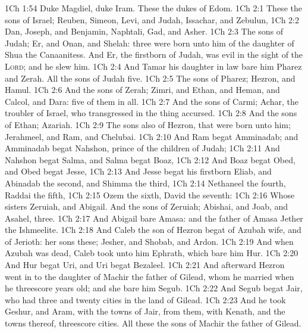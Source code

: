 \vs 1Ch 1:54 Duke Magdiel, duke Iram. These  the dukes of Edom.
\vs 1Ch 2:1 These  the sons of Israel; Reuben, Simeon, Levi, and Judah, Issachar, and Zebulun,
\vs 1Ch 2:2 Dan, Joseph, and Benjamin, Naphtali, Gad, and Asher.
\vs 1Ch 2:3 The sons of Judah; Er, and Onan, and Shelah:  three were born unto him of the daughter of Shua the Canaanitess. And Er, the firstborn of Judah, was evil in the sight of the \textsc{Lord}; and he slew him.
\vs 1Ch 2:4 And Tamar his daughter in law bare him Pharez and Zerah. All the sons of Judah  five.
\vs 1Ch 2:5 The sons of Pharez; Hezron, and Hamul.
\vs 1Ch 2:6 And the sons of Zerah; Zimri, and Ethan, and Heman, and Calcol, and Dara: five of them in all.
\vs 1Ch 2:7 And the sons of Carmi; Achar, the troubler of Israel, who transgressed in the thing accursed.
\vs 1Ch 2:8 And the sons of Ethan; Azariah.
\vs 1Ch 2:9 The sons also of Hezron, that were born unto him; Jerahmeel, and Ram, and Chelubai.
\vs 1Ch 2:10 And Ram begat Amminadab; and Amminadab begat Nahshon, prince of the children of Judah;
\vs 1Ch 2:11 And Nahshon begat Salma, and Salma begat Boaz,
\vs 1Ch 2:12 And Boaz begat Obed, and Obed begat Jesse,
\vs 1Ch 2:13 And Jesse begat his firstborn Eliab, and Abinadab the second, and Shimma the third,
\vs 1Ch 2:14 Nethaneel the fourth, Raddai the fifth,
\vs 1Ch 2:15 Ozem the sixth, David the seventh:
\vs 1Ch 2:16 Whose sisters  Zeruiah, and Abigail. And the sons of Zeruiah; Abishai, and Joab, and Asahel, three.
\vs 1Ch 2:17 And Abigail bare Amasa: and the father of Amasa  Jether the Ishmeelite.
\vs 1Ch 2:18 And Caleb the son of Hezron begat  of Azubah  wife, and of Jerioth: her sons  these; Jesher, and Shobab, and Ardon.
\vs 1Ch 2:19 And when Azubah was dead, Caleb took unto him Ephrath, which bare him Hur.
\vs 1Ch 2:20 And Hur begat Uri, and Uri begat Bezaleel.
\vs 1Ch 2:21 And afterward Hezron went in to the daughter of Machir the father of Gilead, whom he married when he  threescore years old; and she bare him Segub.
\vs 1Ch 2:22 And Segub begat Jair, who had three and twenty cities in the land of Gilead.
\vs 1Ch 2:23 And he took Geshur, and Aram, with the towns of Jair, from them, with Kenath, and the towns thereof,  threescore cities. All these  the sons of Machir the father of Gilead.
